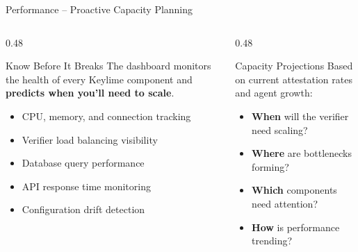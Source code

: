 \begin{frame}{Performance -- Proactive Capacity Planning}
  \begin{columns}[T]
    \begin{column}{0.48\textwidth}
      \begin{block}{Know Before It Breaks}
        \scriptsize
        The dashboard monitors the health of every Keylime component
        and \textbf{predicts when you'll need to scale}.
      \end{block}
      \scriptsize
      \begin{itemize}
        \item CPU, memory, and connection tracking
        \item Verifier load balancing visibility
        \item Database query performance
        \item API response time monitoring
        \item Configuration drift detection
      \end{itemize}
    \end{column}
    \begin{column}{0.48\textwidth}
      \begin{exampleblock}{Capacity Projections}
        \scriptsize
        Based on current attestation rates and agent growth:
      \end{exampleblock}
      \scriptsize
      \begin{itemize}
        \item \textbf{When} will the verifier need scaling?
        \item \textbf{Where} are bottlenecks forming?
        \item \textbf{Which} components need attention?
        \item \textbf{How} is performance trending?
      \end{itemize}

      \vspace{0.2cm}

      \begin{center}
      \end{center}
    \end{column}
  \end{columns}
\end{frame}
